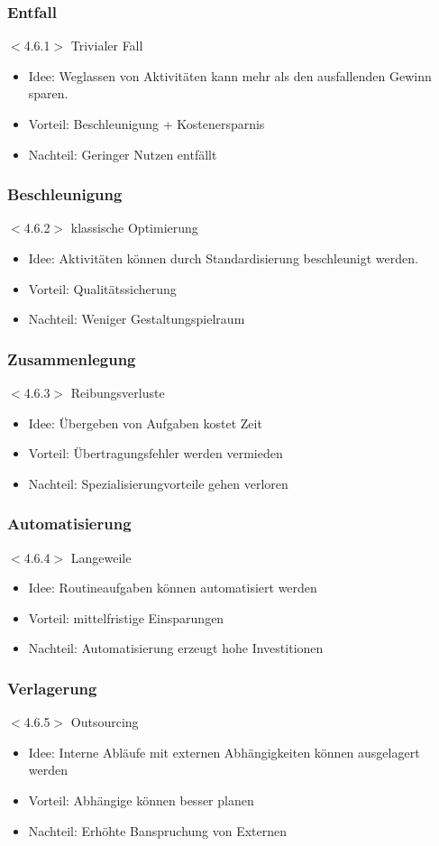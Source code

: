 \documentclass{beamer}
\begin{document}
 \begin{frame}
  \frametitle{Entfall}
  $<$4.6.1$>$
  Trivialer Fall
  \begin{itemize}
    \item Idee: Weglassen von Aktivitäten kann mehr als den ausfallenden Gewinn sparen.
    \item Vorteil: Beschleunigung + Kostenersparnis
    \item Nachteil: Geringer Nutzen entfällt
  \end{itemize}
 \end{frame}

 \begin{frame}
  \frametitle{Beschleunigung}
  $<$4.6.2$>$
  klassische Optimierung
  \begin{itemize}
    \item Idee: Aktivitäten können durch Standardisierung beschleunigt werden.
    \item Vorteil: Qualitätssicherung
    \item Nachteil: Weniger Gestaltungspielraum
  \end{itemize}
 \end{frame}

 \begin{frame}
  \frametitle{Zusammenlegung}
  $<$4.6.3$>$
  Reibungsverluste
  \begin{itemize}
    \item Idee: Übergeben von Aufgaben kostet Zeit
    \item Vorteil: Übertragungsfehler werden vermieden
    \item Nachteil: Spezialisierungvorteile gehen verloren
  \end{itemize}
 \end{frame}

 \begin{frame}
  \frametitle{Automatisierung}
  $<$4.6.4$>$
  Langeweile
  \begin{itemize}
    \item Idee: Routineaufgaben können automatisiert werden
    \item Vorteil: mittelfristige Einsparungen
    \item Nachteil: Automatisierung erzeugt hohe Investitionen
  \end{itemize}
 \end{frame}

 \begin{frame}
  \frametitle{Verlagerung}
  $<$4.6.5$>$
  Outsourcing
  \begin{itemize}
    \item Idee: Interne Abläufe mit externen Abhängigkeiten können ausgelagert werden
    \item Vorteil: Abhängige können besser planen
    \item Nachteil: Erhöhte Banspruchung von Externen
  \end{itemize}
 \end{frame}
\end{document}
